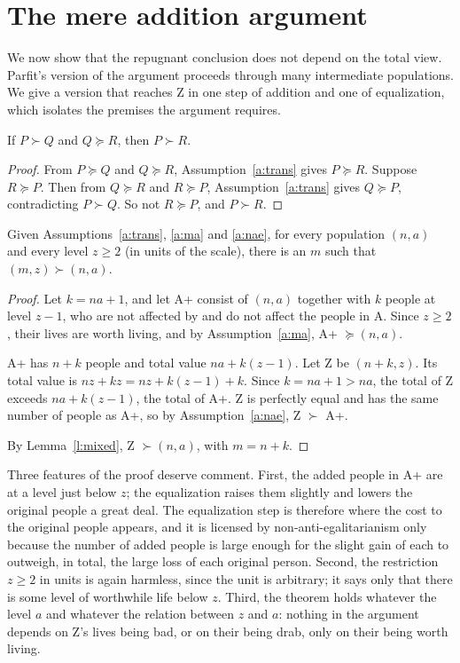 \documentclass{situationist-preprint}
\begin{document}
\section{The mere addition argument}\label{s:ma}

We now show that the repugnant conclusion does not depend on the total view. Parfit's version of the argument proceeds through many intermediate populations. We give a version that reaches Z in one step of addition and one of equalization, which isolates the premises the argument requires.

\begin{lemma}\label{l:mixed}
If $P \succ Q$ and $Q \succeq R$, then $P \succ R$.
\end{lemma}

\begin{proof}
From $P \succeq Q$ and $Q \succeq R$, Assumption~\ref{a:trans} gives $P \succeq R$. Suppose $R \succeq P$. Then from $Q \succeq R$ and $R \succeq P$, Assumption~\ref{a:trans} gives $Q \succeq P$, contradicting $P \succ Q$. So not $R \succeq P$, and $P \succ R$.
\end{proof}

\begin{theorem}\label{t:rc}
Given Assumptions~\ref{a:trans}, \ref{a:ma} and \ref{a:nae}, for every population $(n,a)$ and every level $z \geq 2$ (in units of the scale), there is an $m$ such that $(m,z) \succ (n,a)$.
\end{theorem}

\begin{proof}
Let $k = na + 1$, and let A+ consist of $(n,a)$ together with $k$ people at level $z - 1$, who are not affected by and do not affect the people in A. Since $z \geq 2$, their lives are worth living, and by Assumption~\ref{a:ma}, A+ $\succeq (n,a)$.

A+ has $n + k$ people and total value $na + k(z-1)$. Let Z be $(n+k, z)$. Its total value is $nz + kz = nz + k(z-1) + k$. Since $k = na + 1 > na$, the total of Z exceeds $na + k(z-1)$, the total of A+. Z is perfectly equal and has the same number of people as A+, so by Assumption~\ref{a:nae}, Z $\succ$ A+.

By Lemma~\ref{l:mixed}, Z $\succ (n,a)$, with $m = n + k$.
\end{proof}

Three features of the proof deserve comment. First, the added people in A+ are at a level just below $z$; the equalization raises them slightly and lowers the original people a great deal. The equalization step is therefore where the cost to the original people appears, and it is licensed by non-anti-egalitarianism only because the number of added people is large enough for the slight gain of each to outweigh, in total, the large loss of each original person. Second, the restriction $z \geq 2$ in units is again harmless, since the unit is arbitrary; it says only that there is some level of worthwhile life below $z$. Third, the theorem holds whatever the level $a$ and whatever the relation between $z$ and $a$: nothing in the argument depends on Z's lives being bad, or on their being drab, only on their being worth living.
\end{document}

